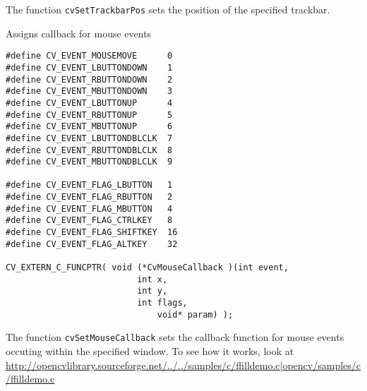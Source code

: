 The function \texttt{cvSetTrackbarPos} sets the position of the specified trackbar.


Assigns callback for mouse events


\begin{lstlisting}
#define CV_EVENT_MOUSEMOVE      0
#define CV_EVENT_LBUTTONDOWN    1
#define CV_EVENT_RBUTTONDOWN    2
#define CV_EVENT_MBUTTONDOWN    3
#define CV_EVENT_LBUTTONUP      4
#define CV_EVENT_RBUTTONUP      5
#define CV_EVENT_MBUTTONUP      6
#define CV_EVENT_LBUTTONDBLCLK  7
#define CV_EVENT_RBUTTONDBLCLK  8
#define CV_EVENT_MBUTTONDBLCLK  9

#define CV_EVENT_FLAG_LBUTTON   1
#define CV_EVENT_FLAG_RBUTTON   2
#define CV_EVENT_FLAG_MBUTTON   4
#define CV_EVENT_FLAG_CTRLKEY   8
#define CV_EVENT_FLAG_SHIFTKEY  16
#define CV_EVENT_FLAG_ALTKEY    32

CV_EXTERN_C_FUNCPTR( void (*CvMouseCallback )(int event, 
					      int x, 
					      int y, 
					      int flags, 
				              void* param) );
\end{lstlisting}

\begin{description}
\end{description}

The function \texttt{cvSetMouseCallback} sets the callback function for mouse events occuting within the specified window. To see how it works, look at \url{http://opencvlibrary.sourceforge.net/../../samples/c/ffilldemo.c|opencv/samples/c/ffilldemo.c} 

